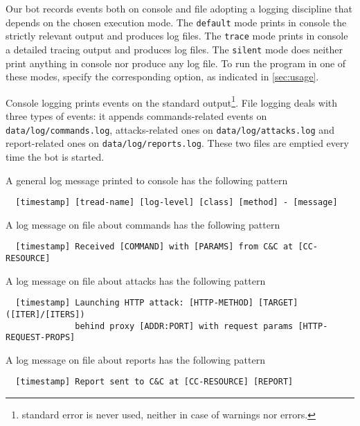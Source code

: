 Our bot records events both on console and file adopting a logging discipline that depends on the chosen execution mode. The \texttt{default} mode prints in console the strictly relevant output and produces log files. The \texttt{trace} mode prints in console a detailed tracing output and produces log files. The \texttt{silent} mode does neither print anything in console nor produce any log file.
To run the program in one of these modes, specify the corresponding option, as indicated in \ref{sec:usage}.

Console logging prints events on the standard output\footnote{standard error is never used, neither in case of warnings nor errors.}.
File logging deals with three types of events: it appends commands-related events on \texttt{data/log/commands.log}, attacks-related ones on \texttt{data/log/attacks.log} and report-related ones on \texttt{data/log/reports.log}. These two files are emptied every time the bot is started.

A general log message printed to console has the following pattern

\begin{verbatim}
  [timestamp] [tread-name] [log-level] [class] [method] - [message]
\end{verbatim}

A log message on file about commands has the following pattern

\begin{verbatim}
  [timestamp] Received [COMMAND] with [PARAMS] from C&C at [CC-RESOURCE]
\end{verbatim}

A log message on file about attacks has the following pattern

\begin{verbatim}
  [timestamp] Launching HTTP attack: [HTTP-METHOD] [TARGET] ([ITER]/[ITERS])
              behind proxy [ADDR:PORT] with request params [HTTP-REQUEST-PROPS]
\end{verbatim}

A log message on file about reports has the following pattern

\begin{verbatim}
  [timestamp] Report sent to C&C at [CC-RESOURCE] [REPORT]
\end{verbatim}
